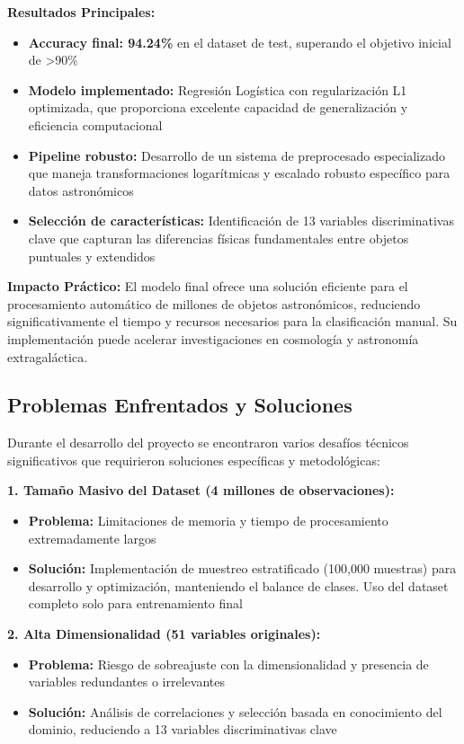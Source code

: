 \documentclass{article}
\begin{document}
\textbf{Resultados Principales:}
\begin{itemize}
    \item \textbf{Accuracy final: 94.24\%} en el dataset de test, superando el objetivo inicial de >90\%
    \item \textbf{Modelo implementado:} Regresión Logística con regularización L1 optimizada, que proporciona excelente capacidad de generalización y eficiencia computacional
    \item \textbf{Pipeline robusto:} Desarrollo de un sistema de preprocesado especializado que maneja transformaciones logarítmicas y escalado robusto específico para datos astronómicos
    \item \textbf{Selección de características:} Identificación de 13 variables discriminativas clave que capturan las diferencias físicas fundamentales entre objetos puntuales y extendidos
\end{itemize}

\textbf{Impacto Práctico:}
El modelo final ofrece una solución eficiente para el procesamiento automático de millones de objetos astronómicos, reduciendo significativamente el tiempo y recursos necesarios para la clasificación manual. Su implementación puede acelerar investigaciones en cosmología y astronomía extragaláctica.

\subsection{Problemas Enfrentados y Soluciones}

Durante el desarrollo del proyecto se encontraron varios desafíos técnicos significativos que requirieron soluciones específicas y metodológicas:

\textbf{1. Tamaño Masivo del Dataset (4 millones de observaciones):}
\begin{itemize}
    \item \textbf{Problema:} Limitaciones de memoria y tiempo de procesamiento extremadamente largos
    \item \textbf{Solución:} Implementación de muestreo estratificado (100,000 muestras) para desarrollo y optimización, manteniendo el balance de clases. Uso del dataset completo solo para entrenamiento final
\end{itemize}

\textbf{2. Alta Dimensionalidad (51 variables originales):}
\begin{itemize}
    \item \textbf{Problema:} Riesgo de sobreajuste con la dimensionalidad y presencia de variables redundantes o irrelevantes
    \item \textbf{Solución:} Análisis de correlaciones y selección basada en conocimiento del dominio, reduciendo a 13 variables discriminativas clave
\end{itemize}
\end{document}

